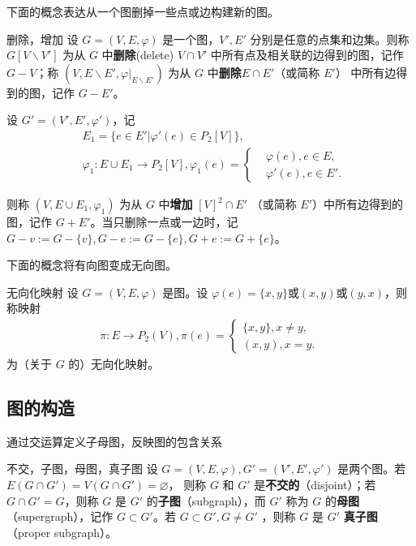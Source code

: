 下面的概念表达从一个图删掉一些点或边构建新的图。
\begin{definition}{删除，增加}
设 $G=(V,E,\varphi)$ 是一个图，$V',E'$ 分别是任意的点集和边集。则称 $G[V\backslash V']$ 为从 $G$ 中\textbf{删除}(delete) $V\cap V'$ 中所有点及相关联的边得到的图，记作 $G-V$；称
 $(V,E\backslash E',\varphi|_{E\backslash E'})$ 为从 $G$ 中\textbf{删除}$E\cap E'$（或简称 $E'$） 中所有边得到的图，记作 $G-E'$。
 
 设 $G'=(V',E',\varphi')$，记
 \begin{equation}
 \begin{aligned}
  &E_1=\{e\in E'|\varphi'(e)\in P_2[V]\},\\
  &\varphi_1:E\cup E_1\rightarrow P_2[V],\varphi_1(e)=\left\{\begin{aligned}
  &\varphi(e),e\in E,\\
  &\varphi'(e),e\in E'.
  \end{aligned}\right.
 \end{aligned}~
 \end{equation}
 
 则称 $(V,E\cup E_1,\varphi_1)$ 为从 $G$ 中\textbf{增加} $[V]^2\cap E'$ （或简称 $E'$）中所有边得到的图，记作 $G+E'$。当只删除一点或一边时，记 $G-v:=G-\{v\},G-e:=G-\{e\},G+e:=G+\{e\}$。
\end{definition}
下面的概念将有向图变成无向图。
\begin{definition}{无向化映射}
设 $G=(V,E,\varphi)$ 是图。设 $\varphi(e)=\{x,y\}\text{或}(x,y)\text{或}(y,x)$，则称映射
\begin{equation}
\begin{aligned}
\pi:E\rightarrow P_2(V),\pi(e)=\left\{\begin{aligned}
\{x,y\},x\neq y,\\
(x,y),x=y.
\end{aligned}\right.
\end{aligned}~
\end{equation}
为（关于 $G$ 的）无向化映射。

\end{definition}

\subsection{图的构造}

通过交运算定义子母图，反映图的包含关系

\begin{definition}{不交，子图，母图，真子图}
设 $G=(V,E,\varphi),G'=(V',E',\varphi')$ 是两个图。若 $E(G\cap G')=V(G\cap G')=\varnothing$， 则称 $G$ 和 $G'$ 是\textbf{不交的}（disjoint）；若 $G\cap G'=G$，则称 $G$ 是 $G'$ 的\textbf{子图}（subgraph），而 $G'$ 称为 $G$ 的\textbf{母图}（supergraph），记作 $G\subset G'$。若 $G\subset G', G\neq G'$ ，则称 $G$ 是 $G'$ \textbf{真子图}（proper subgraph）。
\end{definition}

